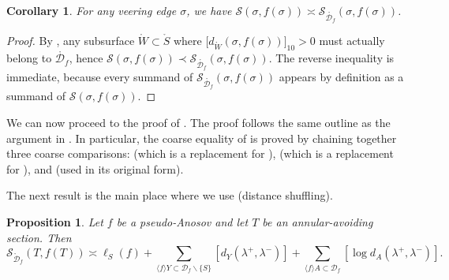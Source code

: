 \documentclass[11pt,letterpaper]{amsart}
\newcommand{\mc}{\mathcal}
\newcommand{\mr}{\mathring}
\newcommand{\psub}{\mr W}
\numberwithin{equation}{section}
\newtheorem{proposition}[theorem]{Proposition}
\newtheorem{corollary}[theorem]{Corollary}
\theoremstyle{definition}
\renewcommand{\setminus}{\smallsetminus}
\begin{document}
\begin{corollary}\label{Cor:DfFullSum}
For any veering edge $\sigma$, we have $\mc S(\sigma, f(\sigma)) \asymp \mc S_{\mr{\mc D_f}}(\sigma, f(\sigma))$.
\end{corollary}

\begin{proof}
By , any subsurface $\psub \subset \mr S$ where $\big[ d_{\psub}(\sigma, f(\sigma)) \big]_{10} > 0$ must actually belong to $\mr{\mc D_f}$, hence $\mc S(\sigma, f(\sigma)) \prec \mc S_{\mr{\mc D_f}}(\sigma, f(\sigma))$. The reverse inequality is immediate, because 
every summand of $\mc S_{\mr{\mc D_f}}(\sigma, f(\sigma))$ appears by definition as a summand of $\mc S(\sigma, f(\sigma))$.
\end{proof}

We can now proceed to the proof of . The proof follows the same outline as the argument in . In particular, the coarse equality of  is proved by chaining together three coarse comparisons:  (which is a replacement for ),  (which is a replacement for ), and  (used in its original form).


The next result is the main place where we use  (distance shuffling). 

\begin{proposition}\label{Prop:ShufflingTriangIntersection}
Let $f$ be a pseudo-Anosov and let $T$ be an annular-avoiding section. 
Then
\[
\mc S_{\mr{\mc D}_f} (T, f(T)) \asymp  \ell_{S}(f) + \sum_{\langle f \rangle Y \subset {\mc D}_f \setminus \{ S \}} [d_Y(\lambda^+,\lambda^-)] + \sum_{\langle f \rangle A \subset {\mc D}_f} [\log d_A(\lambda^+,\lambda^-)].
\]
\end{proposition}
\end{document}
